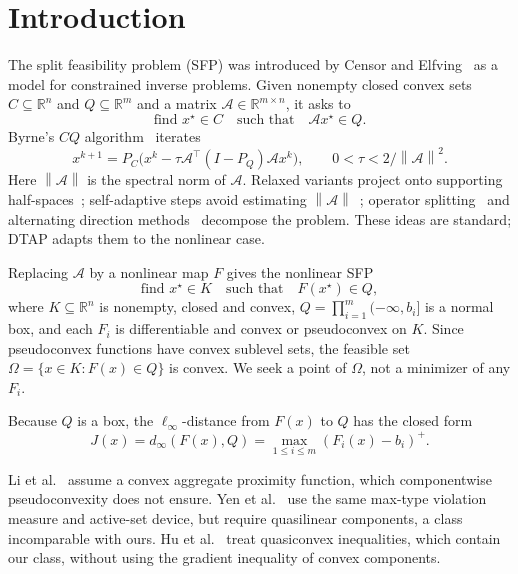 \documentclass[]{interact}
\theoremstyle{plain}
\theoremstyle{definition}
\theoremstyle{remark}
\newcommand{\R}{\mathbb{R}}
\newcommand{\norm}[1]{\left\lVert #1 \right\rVert}
\begin{document}
\section{Introduction}\label{sec:intro}

The split feasibility problem (SFP) was introduced by Censor and Elfving~\citep{censor1994} as a model for constrained inverse problems. Given nonempty closed convex sets $C\subseteq\R^n$ and $Q\subseteq\R^m$ and a matrix $\mathcal A\in\R^{m\times n}$, it asks to
\begin{equation}\label{eq:sfp-intro}
\text{find }x^\star\in C\quad\text{such that}\quad\mathcal A x^\star\in Q.
\end{equation}
Byrne's $CQ$ algorithm~\citep{byrne2002} iterates
\begin{equation}\label{eq:cq-intro}
x^{k+1}=P_C\bigl(x^k-\tau\mathcal A^\top(I-P_Q)\mathcal A x^k\bigr),
\qquad 0<\tau<2/\norm{\mathcal A}^2.
\end{equation}
Here $\norm{\mathcal A}$ is the spectral norm of $\mathcal A$. Relaxed variants project onto supporting half-spaces~\citep{yang2004}; self-adaptive steps avoid estimating $\norm{\mathcal A}$~\citep{zhang2009adaptive,zhao2011adaptive,lopez2012}; operator splitting~\citep{zhang2012simultaneous} and alternating direction methods~\citep{yang2014alternating} decompose the problem. These ideas are standard; DTAP adapts them to the nonlinear case.

Replacing $\mathcal A$ by a nonlinear map $F$ gives the nonlinear SFP~\citep{li2013nsfp,yen2019}
\begin{equation}\label{eq:nsfp-intro}
\text{find }x^\star\in K\quad\text{such that}\quad F(x^\star)\in Q,
\end{equation}
where $K\subseteq\R^n$ is nonempty, closed and convex, $Q=\prod_{i=1}^m(-\infty,b_i]$ is a normal box, and each $F_i$ is differentiable and convex or pseudoconvex on $K$. Since pseudoconvex functions have convex sublevel sets, the feasible set $\Omega=\{x\in K:F(x)\in Q\}$ is convex. We seek a point of $\Omega$, not a minimizer of any $F_i$.

Because $Q$ is a box, the $\ell_\infty$-distance from $F(x)$ to $Q$ has the closed form
\[
J(x)=d_\infty(F(x),Q)=\max_{1\le i\le m}(F_i(x)-b_i)^+.
\]

Li et al.~\citep{li2013nsfp} assume a convex aggregate proximity function, which componentwise pseudoconvexity does not ensure. Yen et al.~\citep{yen2019} use the same max-type violation measure and active-set device, but require quasilinear components, a class incomparable with ours. Hu et al.~\citep{hu2022quasi} treat quasiconvex inequalities, which contain our class, without using the gradient inequality of convex components.
\end{document}
